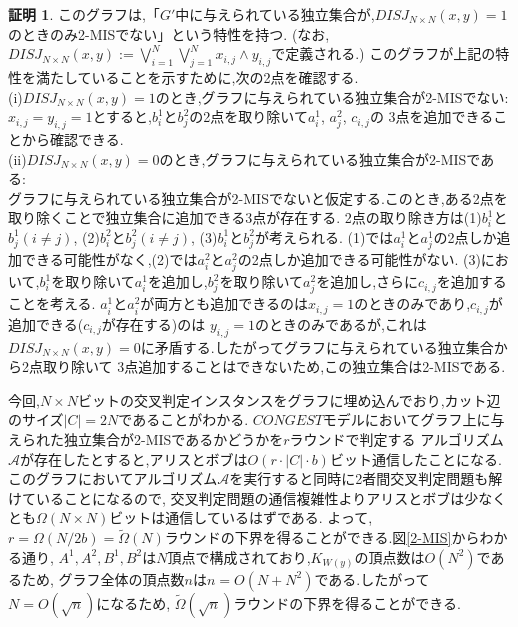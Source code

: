 \documentclass[12]{thesis}
\theoremstyle{definition}
\newtheorem*{prf*}{証明}
\begin{document}
\begin{prf*}
このグラフは,「$G'$中に与えられている独立集合が,$DISJ_{N \times N} (x, y) = 1$のときのみ2-MISでない」という特性を持つ. 
(なお,$DISJ_{N \times N} (x, y) :=\bigvee_{i = 1}^{N} \bigvee_{j = 1}^{N} x_{i, j} \land y_{i, j}$で定義される.)
このグラフが上記の特性を満たしていることを示すために,次の2点を確認する. \\
(i)$DISJ_{N \times N} (x, y) = 1$のとき,グラフに与えられている独立集合が2-MISでない: \\
$x_{i, j} = y_{i, j} =1$とすると,$b_{i}^{1}$と$b_{j}^{2}$の2点を取り除いて$a_{i}^{1}$, $a_{j}^{2}$, $c_{i, j}$の
3点を追加できることから確認できる. \\
(ii)$DISJ_{N \times N} (x, y) = 0$のとき,グラフに与えられている独立集合が2-MISである: \\ 
グラフに与えられている独立集合が2-MISでないと仮定する.このとき,ある2点を取り除くことで独立集合に追加できる3点が存在する.
2点の取り除き方は(1)$b_{i}^{1}$と$b_{j}^{1}(i \neq j)$, (2)$b_{i}^{2}$と$b_{j}^{2}(i \neq j)$, (3)$b_{i}^{1}$と$b_{j}^{2}$が考えられる.
(1)では$a_{i}^{1}$と$a_{j}^{1}$の2点しか追加できる可能性がなく,(2)では$a_{i}^{2}$と$a_{j}^{2}$の2点しか追加できる可能性がない.
(3)において,$b_{i}^{1}$を取り除いて$a_{i}^{1}$を追加し,$b_{j}^{2}$を取り除いて$a_{j}^{2}$を追加し,さらに$c_{i, j}$を追加することを考える.
$a_{i}^{1}$と$a_{i}^{2}$が両方とも追加できるのは$x_{i, j} = 1$のときのみであり,$c_{i, j}$が追加できる($c_{i, j}$が存在する)のは
$y_{i, j} = 1$のときのみであるが,これは$DISJ_{N \times N} (x, y) = 0$に矛盾する.したがってグラフに与えられている独立集合から2点取り除いて
3点追加することはできないため,この独立集合は2-MISである.

今回,$N \times N$ビットの交叉判定インスタンスをグラフに埋め込んでおり,カット辺のサイズ$|C| = 2N$であることがわかる.
$CONGEST$モデルにおいてグラフ上に与えられた独立集合が2-MISであるかどうかを$r$ラウンドで判定する
アルゴリズム$\mathcal{A}$が存在したとすると,アリスとボブは$O(r \cdot |C| \cdot b)$ビット通信したことになる.
このグラフにおいてアルゴリズム$\mathcal{A}$を実行すると同時に2者間交叉判定問題も解けていることになるので,
交叉判定問題の通信複雑性よりアリスとボブは少なくとも$\Omega (N \times N)$ビットは通信しているはずである.
よって,$r = \Omega (N / 2b) = \tilde{\Omega}(N)$ラウンドの下界を得ることができる.図\ref{2-MIS}からわかる通り,
$A^{1}, A^{2}, B^{1}, B^{2}$は$N$頂点で構成されており,$K_{W(y)}$の頂点数は$O(N^{2})$であるため,
グラフ全体の頂点数$n$は$n = O(N + N^{2})$である.したがって$N = O(\sqrt{n})$になるため,
$\tilde{\Omega}(\sqrt{n})$ラウンドの下界を得ることができる. 
\end{prf*}
\newpage
\end{document}
